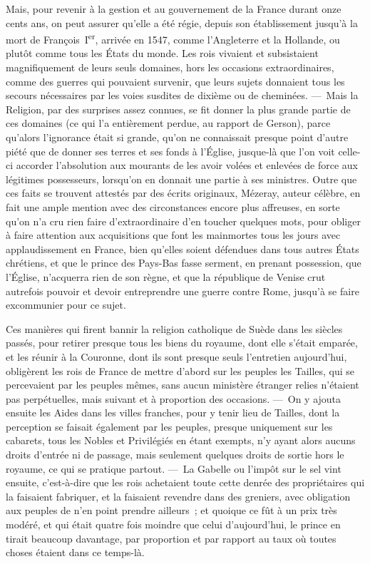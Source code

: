 \documentclass[french,twoside]{book} %
\begin{document}
Mais, pour revenir à la gestion et au gouvernement de la France durant onze cents ans, on peut assurer qu’elle a été régie, depuis son établissement jusqu’à la mort de François I\textsuperscript{er}, arrivée en 1547, comme l’Angleterre et la Hollande, ou plutôt comme tous les États du monde. Les rois vivaient et subsistaient magnifiquement de leurs seuls domaines, hors les occasions extraordinaires, comme des guerres qui pouvaient survenir, que leurs sujets donnaient tous les secours nécessaires par les voies susdites de dixième ou de cheminées. — Mais la Religion, par des surprises assez connues, se fit donner la plus grande partie de ces domaines (ce qui l’a entièrement perdue, au rapport de Gerson), parce qu’alors l’ignorance était si grande, qu’on ne connaissait presque point d’autre piété que de donner ses terres et ses fonds à l’Église, jusque-là que l’on voit celle-ci accorder l’absolution aux mourants de les avoir volées et enlevées de force aux légitimes possesseurs, lorsqu’on en donnait une partie à ses ministres. Outre que ces faits se trouvent attestés par des écrits originaux, Mézeray, auteur célèbre, en fait une ample mention avec des circonstances encore plus affreuses, en sorte qu’on n’a cru rien faire d’extraordinaire d’en toucher quelques mots, pour obliger à faire attention aux acquisitions que font les mainmortes tous les jours avec applaudissement en France, bien qu’elles soient défendues dans tous autres États chrétiens, et que le prince des Pays-Bas fasse serment, en prenant possession, que l’Église, n’acquerra rien de son règne, et que la république de Venise crut autrefois pouvoir et devoir entreprendre une guerre contre Rome, jusqu’à se faire excommunier pour ce sujet.\par
Ces manières qui firent bannir la religion catholique de Suède dans les siècles passés, pour retirer presque tous les biens du royaume, dont elle s’était emparée, et les réunir à la Couronne, dont ils sont presque seuls l’entretien aujourd’hui, obligèrent les rois de France de mettre d’abord sur les peuples les Tailles, qui se percevaient par les peuples mêmes, sans aucun ministère étranger relies n’étaient pas perpétuelles, mais suivant et à proportion des occasions. — On y ajouta ensuite les Aides dans les villes franches, pour y tenir lieu de Tailles, dont la perception se faisait également par les peuples, presque uniquement sur les cabarets, tous les Nobles et Privilégiés en étant exempts, n’y ayant alors aucuns droits d’entrée ni de passage, mais seulement quelques droits de sortie hors le royaume, ce qui se pratique partout. — La Gabelle ou l’impôt sur le sel vint ensuite, c’est-à-dire que les rois achetaient toute cette denrée des propriétaires qui la faisaient fabriquer, et la faisaient revendre dans des greniers, avec obligation aux peuples de n’en point prendre ailleurs ; et quoique ce fût à un prix très modéré, et qui était quatre fois moindre que celui d’aujourd’hui, le prince en tirait beaucoup davantage, par proportion et par rapport au taux où toutes choses étaient dans ce temps-là.\par
\end{document}
